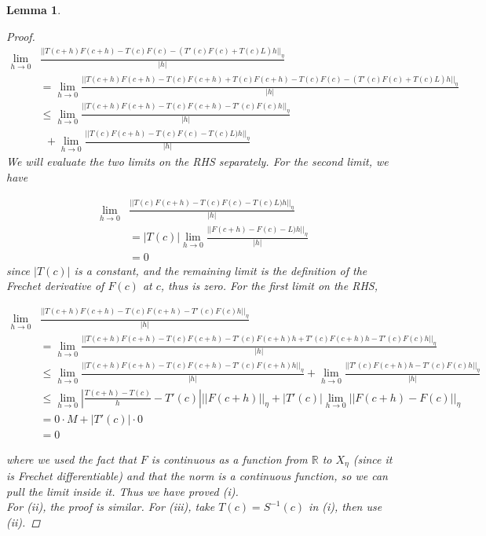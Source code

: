 \documentclass[12pt]{article}
\def\R{{\mathbb R}}
\newtheorem{lemma}{Lemma}
\begin{document}
\begin{lemma}
\begin{proof}
\begin{align*}
\lim_{h \rightarrow 0}&\frac{||T(c+h)F(c+h) - T(c)F(c) - (T'(c)F(c) + T(c)L)h||_\eta}{|h|} \\
&= \lim_{h \rightarrow 0}\frac{||T(c+h)F(c+h) - T(c)F(c+h) + T(c)F(c+h) - T(c)F(c) - (T'(c)F(c) + T(c)L)h||_\eta}{|h|} \\
&\leq \lim_{h \rightarrow 0}\frac{||T(c+h)F(c+h) - T(c)F(c+h) - T'(c)F(c) h ||_\eta}{|h|} \\
&\:\:+ \lim_{h \rightarrow 0}\frac{||T(c)F(c+h) - T(c)F(c) - T(c)L)h||_\eta}{|h|}
\end{align*}
We will evaluate the two limits on the RHS separately. For the second limit, we have

\begin{align*}
\lim_{h \rightarrow 0}&\frac{||T(c)F(c+h) - T(c)F(c) - T(c)L)h||_\eta}{|h|} \\
&= |T(c)| \lim_{h \rightarrow 0}\frac{||F(c+h) - F(c) - L)h||_\eta}{|h|} \\
&= 0
\end{align*}
since $|T(c)|$ is a constant, and the remaining limit is the definition of the Frechet derivative of $F(c)$ at $c$, thus is zero. For the first limit on the RHS,

\begin{align*}
\lim_{h \rightarrow 0}&\frac{||T(c+h)F(c+h) - T(c)F(c+h) - T'(c)F(c) h ||_\eta}{|h|} \\
&= \lim_{h \rightarrow 0}\frac{||T(c+h)F(c+h) - T(c)F(c+h) - T'(c)F(c+h)h + T'(c)F(c+h)h - T'(c)F(c) h ||_\eta}{|h|} \\
&\leq \lim_{h \rightarrow 0}\frac{||T(c+h)F(c+h) - T(c)F(c+h) - T'(c)F(c+h)h||_\eta}{|h|} + \lim_{h \rightarrow 0} \frac{||T'(c)F(c+h)h - T'(c)F(c) h ||_\eta}{|h|} \\
&\leq \lim_{h \rightarrow 0} \left| \frac{T(c+h) - T(c)}{h} - T'(c) \right| ||F(c+h)||_\eta + |T'(c)| \lim_{h \rightarrow 0} ||F(c+h) - F(c) ||_\eta \\
&= 0 \cdot M + |T'(c)| \cdot 0 \\
&= 0
\end{align*}

where we used the fact that $F$ is continuous as a function from $\R$ to $X_\eta$ (since it is Frechet differentiable) and that the norm is a continuous function, so we can pull the limit inside it. Thus we have proved (i).\\

For (ii), the proof is similar. For (iii), take $T(c) = S^{-1}(c)$ in (i), then use (ii).

\end{proof}
\end{lemma}
\end{document}
